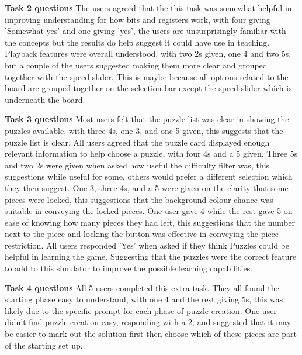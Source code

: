 \documentclass{l4proj}
\begin{document}
\textbf{Task 2 questions}
The users agreed that the this task was somewhat helpful in improving understanding for how bits and registers work, with four giving 'Somewhat yes' and one giving 'yes', the users are unsurprisingly familiar with the concepts but the results do help suggest it could have use in teaching. Playback features were overall understood, with two 2s given, one 4 and two 5s, but a couple of the users suggested making them more clear and grouped together with the speed slider. This is maybe because all options related to the board are grouped together on the selection bar except the speed slider which is underneath the board. 

\textbf{Task 3 questions}
Most users felt that the puzzle list was clear in showing the puzzles available, with three 4s, one 3, and one 5 given, this suggests that the puzzle list is clear. All users agreed that the puzzle card displayed enough relevant information to help choose a puzzle, with four 4s and a 5 given. Three 5s and two 2s were given when asked how useful the difficulty filter was, this suggestions while useful for some, others would prefer a different selection which they then suggest. One 3, three 4s, and a 5 were given on the clarity that some pieces were locked, this suggestions that the background colour chance was suitable in conveying the locked pieces. One user gave 4 while the rest gave 5 on ease of knowing how many pieces they had left, this suggestions that the number next to the piece and locking the button was effective in conveying the piece restriction. All users responded 'Yes' when asked if they think Puzzles could be helpful in learning the game. Suggesting that the puzzles were the correct feature to add to this simulator to improve the possible learning capabilities.

\textbf{Task 4 questions}
All 5 users completed this extra task. They all found the starting phase easy to understand, with one 4 and the rest giving 5s, this was likely due to the specific prompt for each phase of puzzle creation. One user didn't find puzzle creation easy, responding with a 2, and suggested that it may be easier to mark out the solution first then choose which of these pieces are part of the starting set up. 
\end{document}

